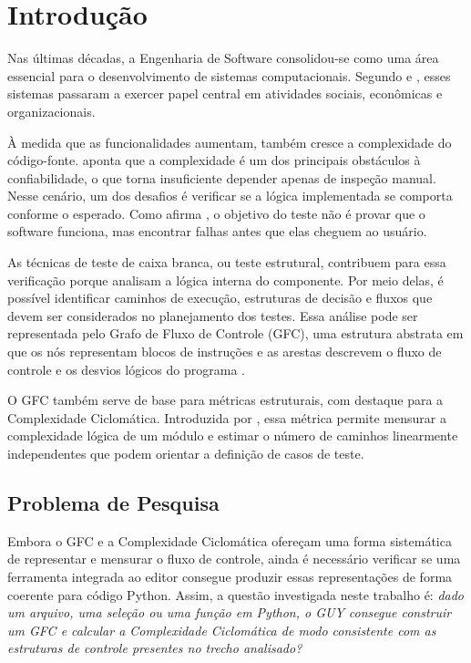 \chapter{Introdução}
\label{cap:01}

Nas últimas décadas, a Engenharia de Software consolidou-se como uma área essencial para o desenvolvimento de sistemas computacionais. Segundo  e , esses sistemas passaram a exercer papel central em atividades sociais, econômicas e organizacionais.

À medida que as funcionalidades aumentam, também cresce a complexidade do código-fonte.  aponta que a complexidade é um dos principais obstáculos à confiabilidade, o que torna insuficiente depender apenas de inspeção manual. Nesse cenário, um dos desafios é verificar se a lógica implementada se comporta conforme o esperado. Como afirma , o objetivo do teste não é provar que o software funciona, mas encontrar falhas antes que elas cheguem ao usuário.

As técnicas de teste de caixa branca, ou teste estrutural, contribuem para essa verificação porque analisam a lógica interna do componente. Por meio delas, é possível identificar caminhos de execução, estruturas de decisão e fluxos que devem ser considerados no planejamento dos testes. Essa análise pode ser representada pelo Grafo de Fluxo de Controle (GFC), uma estrutura abstrata em que os nós representam blocos de instruções e as arestas descrevem o fluxo de controle e os desvios lógicos do programa \cite{Delamaro2013}.

O GFC também serve de base para métricas estruturais, com destaque para a Complexidade Ciclomática. Introduzida por , essa métrica permite mensurar a complexidade lógica de um módulo e estimar o número de caminhos linearmente independentes que podem orientar a definição de casos de teste.


\section{Problema de Pesquisa}
\label{sec:problema_pesquisa}

Embora o GFC e a Complexidade Ciclomática ofereçam uma forma sistemática de representar e mensurar o fluxo de controle, ainda é necessário verificar se uma ferramenta integrada ao editor consegue produzir essas representações de forma coerente para código Python. Assim, a questão investigada neste trabalho é: \textit{dado um arquivo, uma seleção ou uma função em Python, o GUY consegue construir um GFC e calcular a Complexidade Ciclomática de modo consistente com as estruturas de controle presentes no trecho analisado?}

